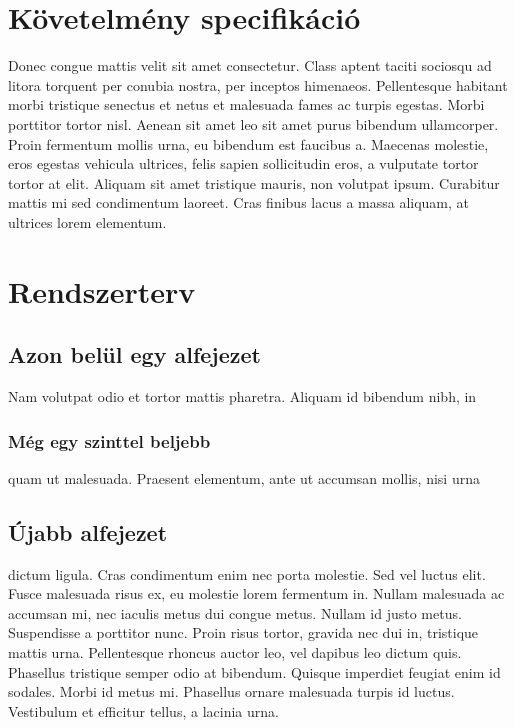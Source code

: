 \documentclass[a4paper,12pt,oneside]{report}
\begin{document}
\chapter{Követelmény specifikáció}

Donec congue mattis velit sit amet consectetur. Class aptent taciti sociosqu ad
litora torquent per conubia nostra, per inceptos himenaeos. Pellentesque
habitant morbi tristique senectus et netus et malesuada fames ac turpis
egestas. Morbi porttitor tortor nisl. Aenean sit amet leo sit amet purus
bibendum ullamcorper. Proin fermentum mollis urna, eu bibendum est faucibus a.
Maecenas molestie, eros egestas vehicula ultrices, felis sapien sollicitudin
eros, a vulputate tortor tortor at elit. Aliquam sit amet tristique mauris, non
volutpat ipsum. Curabitur mattis mi sed condimentum laoreet. Cras finibus lacus
a massa aliquam, at ultrices lorem elementum.


\chapter{Rendszerterv}

\section{Azon belül egy alfejezet}

Nam volutpat odio et tortor mattis pharetra. Aliquam id bibendum nibh, in

\subsection{Még egy szinttel beljebb}

quam ut malesuada. Praesent elementum, ante ut accumsan mollis, nisi urna

\section{Újabb alfejezet}

dictum ligula. Cras condimentum enim nec porta molestie. Sed vel luctus elit.
Fusce malesuada risus ex, eu molestie lorem fermentum in. Nullam malesuada ac
accumsan mi, nec iaculis metus dui congue metus. Nullam id justo metus.
Suspendisse a porttitor nunc. Proin risus tortor, gravida nec dui in, tristique
mattis urna. Pellentesque rhoncus auctor leo, vel dapibus leo dictum quis.
Phasellus tristique semper odio at bibendum. Quisque imperdiet feugiat enim id
sodales. Morbi id metus mi. Phasellus ornare malesuada turpis id luctus.
Vestibulum et efficitur tellus, a lacinia urna.
\end{document}
